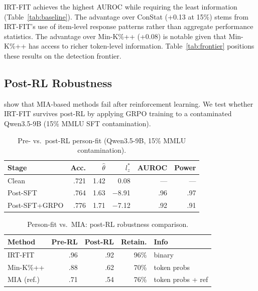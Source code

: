 \documentclass[11pt,a4paper]{article}
\begin{document}
IRT-FIT achieves the highest AUROC while requiring the least information (Table~\ref{tab:baseline}). The advantage over ConStat (+0.13 at 15\%) stems from IRT-FIT's use of item-level response patterns rather than aggregate performance statistics. The advantage over Min-K\%++ (+0.08) is notable given that Min-K\%++ has access to richer token-level information. Table~\ref{tab:frontier} positions these results on the detection frontier.

\subsection{Post-RL Robustness}
\label{sec:post-rl}

\citet{wang2025reassessing} show that MIA-based methods fail after reinforcement learning. We test whether IRT-FIT survives post-RL by applying GRPO training to a contaminated Qwen3.5-9B (15\% MMLU SFT contamination).

\begin{table}[t]
\centering
\caption{Pre- vs.\ post-RL person-fit (Qwen3.5-9B, 15\% MMLU contamination).}
\label{tab:post-rl}
\small
\begin{tabular}{lrrrrr}
\toprule
\textbf{Stage} & \textbf{Acc.} & $\hat{\theta}$ & $l_z^*$ & \textbf{AUROC} & \textbf{Power} \\
\midrule
Clean & .721 & 1.42 & 0.08 & --- & --- \\
Post-SFT & .764 & 1.63 & $-$8.91 & .96 & .97 \\
Post-SFT+GRPO & .776 & 1.71 & $-$7.12 & .92 & .91 \\
\bottomrule
\end{tabular}
\end{table}

\begin{table}[t]
\centering
\caption{Person-fit vs.\ MIA: post-RL robustness comparison.}
\label{tab:post-rl-comparison}
\small
\begin{tabular}{lrrrl}
\toprule
\textbf{Method} & \textbf{Pre-RL} & \textbf{Post-RL} & \textbf{Retain.} & \textbf{Info} \\
\midrule
IRT-FIT & .96 & .92 & 96\% & binary \\
Min-K\%++ & .88 & .62 & 70\% & token probs \\
MIA (ref.) & .71 & .54 & 76\% & token probs + ref \\
\bottomrule
\end{tabular}
\end{table}
\end{document}
